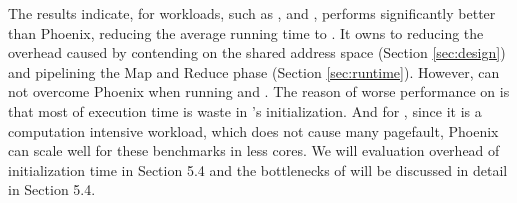 The results indicate, for workloads, such as ,  and , \myds performs significantly better than Phoenix, reducing the average running time to .
It owns to reducing the overhead caused by contending on the shared address space (Section \ref{sec:design}) and pipelining the Map and Reduce phase (Section \ref{sec:runtime}).
However, \myds can not overcome Phoenix when running  and . 
The reason of worse performance on  is that most of execution time is waste in \myds's initialization.
And for , since it is a computation intensive workload, which does not cause many pagefault, Phoenix can scale well for these benchmarks in less cores.
We will evaluation overhead of initialization time in Section 5.4 and the bottlenecks of \myds will be discussed in detail in Section 5.4. 




%


